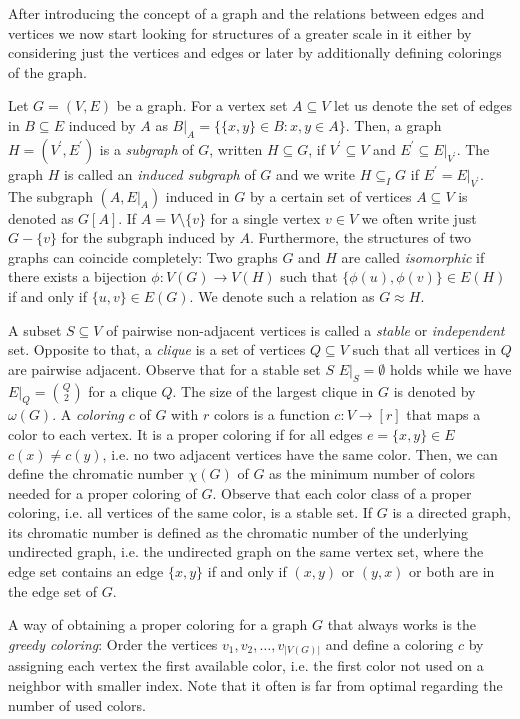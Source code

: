 After introducing the concept of a graph and the relations between edges and vertices we now start looking for structures of a greater scale in it either by considering just the vertices and edges or later by additionally defining colorings of the graph. 

Let $G=(V,E)$ be a graph. For a vertex set $A\subseteq V$ let us denote the set of edges in $B\subseteq E$ induced by $A$ as $B\vert_A=\lbrace \lbrace x,y\rbrace\in B : x,y\in A\rbrace$. Then, a graph $H=(V^\prime ,E^\prime )$ is a \textit{subgraph} of $G$, written $H\subseteq G$, if $V^\prime\subseteq V$ and $E^\prime\subseteq E\vert_{V^\prime}$. The graph $H$ is called an \textit{induced subgraph} of $G$ and we write $H\subseteq_I G$ if $E^\prime = E\vert_{V^\prime}$. The subgraph $(A,E\vert_A)$ induced in $G$ by a certain set of vertices $A\subseteq V$ is denoted as $G[A]$. If $A=V\setminus \{v\}$ for a single vertex $v\in V$ we often write just $G-\{v\}$ for the subgraph induced by $A$. Furthermore, the structures of two graphs can coincide completely: Two graphs $G$ and $H$ are called \textit{isomorphic} if there exists a bijection $\phi :V(G)\to V(H)$ such that $\lbrace\phi (u), \phi (v)\rbrace\in E(H)$ if and only if $\lbrace u, v\rbrace\in E(G)$. We denote such a relation as $G\approx H$.

A subset $S\subseteq V$ of pairwise non-adjacent vertices is called a \textit{stable} or \textit{independent} set. Opposite to that, a \textit{clique} is a set of vertices $Q\subseteq V$ such that all vertices in $Q$ are pairwise adjacent. Observe that for a stable set $S$ $E\vert_S =\emptyset$ holds while we have $E\vert_Q={Q\choose 2}$ for a clique $Q$. The size of the largest clique in $G$ is denoted by $\omega (G)$. A \textit{coloring} $c$ of $G$ with $r$ colors is a function $c:V\to [r]$ that maps a color to each vertex. It is a proper coloring if for all edges $e = \lbrace x,y\rbrace\in E$ $c(x)\neq c(y)$, i.e. no two adjacent vertices have the same color. Then, we can define the chromatic number $\chi (G)$ of $G$ as the minimum number of colors needed for a proper coloring of $G$. Observe that each color class of a proper coloring, i.e. all vertices of the same color, is a stable set. If $G$ is a directed graph, its chromatic number is defined as the chromatic number of the underlying undirected graph, i.e. the undirected graph on the same vertex set, where the edge set contains an edge $\{x,y\}$ if and only if $(x,y)$ or $(y,x)$ or both are in the edge set of $G$.

A way of obtaining a proper coloring for a graph $G$ that always works is the \textit{greedy coloring}: Order the vertices $v_1, v_2, \dots ,v_{\vert V(G) \vert }$ and define a coloring $c$ by assigning each vertex the first available color, i.e. the first color not used on a neighbor with smaller index. Note that it often is far from optimal regarding the number of used colors.\\

